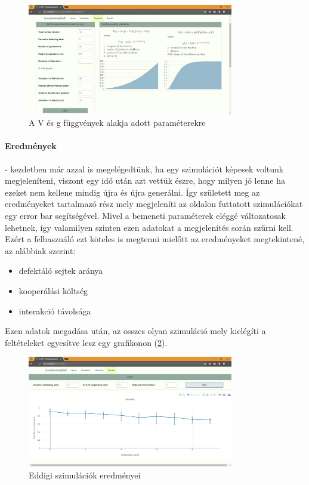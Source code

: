 \begin{figure}[ht!]
	\centering
	\includegraphics[width=90mm]{images/SimulationFunctionDiagrams}
	\caption{A V és g függvények alakja adott paraméterekre}
	\label{fig:SimulationFunctionDiagrams}
\end{figure}


\paragraph{Eredmények}- kezdetben már azzal is megelégedtünk, ha egy szimulációt képesek voltunk megjeleníteni, viszont egy idő után azt vettük észre, hogy milyen jó lenne ha ezeket nem kellene mindig újra és újra generálni. Így született meg az eredményeket tartalmazó rész mely megjeleníti az oldalon futtatott szimulációkat egy error bar segítségével. Mivel a bemeneti paraméterek eléggé változatosak lehetnek, így valamilyen szinten ezen adatokat a megjelenítés során szűrni kell. Ezért a felhasználó ezt köteles is megtenni mielőtt az eredményeket megtekintené, az alábbiak szerint:
\begin{itemize}[noitemsep]
	\item defektáló sejtek aránya
	\item kooperálási költség 
	\item interakció távolsága
\end{itemize}
Ezen adatok megadása után, az összes olyan szimuláció mely kielégíti a feltételeket egyesítve lesz egy grafikonon (\ref{fig:SimulationResults}).

\begin{figure}[ht!]
	\centering
	\includegraphics[width=90mm]{images/SimulationResults}
	\caption{Eddigi szimulációk eredményei}
	\label{fig:SimulationResults}
\end{figure}


